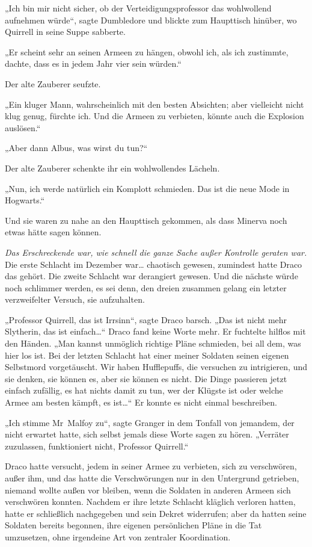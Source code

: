 {„Ich bin mir nicht sicher, ob der Verteidigungsprofessor das wohlwollend aufnehmen würde“, sagte Dumbledore und blickte zum Haupttisch hinüber, wo Quirrell in seine Suppe sabberte.

„Er scheint sehr an seinen Armeen zu hängen, obwohl ich, als ich zustimmte, dachte, dass es in jedem Jahr vier sein würden.“

Der alte Zauberer seufzte.

„Ein kluger Mann, wahrscheinlich mit den besten Absichten; aber vielleicht nicht klug genug, fürchte ich. Und die Armeen zu verbieten, könnte auch die Explosion auslösen.“

„Aber dann Albus, was wirst du tun?“

Der alte Zauberer schenkte ihr ein wohlwollendes Lächeln.

„Nun, ich werde natürlich ein Komplott schmieden. Das ist die neue Mode in Hogwarts.“

Und sie waren zu nahe an den Haupttisch gekommen, als dass Minerva noch etwas hätte sagen können.

\emph{Das Erschreckende war, wie schnell die ganze Sache außer Kontrolle geraten war.} Die erste Schlacht im Dezember war… chaotisch gewesen, zumindest hatte Draco das gehört. Die zweite Schlacht war derangiert gewesen. Und die nächste würde noch schlimmer werden, es sei denn, den dreien zusammen gelang ein letzter verzweifelter Versuch, sie aufzuhalten.

„Professor Quirrell, das ist Irrsinn“, sagte Draco barsch. „Das ist nicht mehr Slytherin, das ist einfach…“ Draco fand keine Worte mehr. Er fuchtelte hilflos mit den Händen. „Man kannst unmöglich richtige Pläne schmieden, bei all dem, was hier los ist. Bei der letzten Schlacht hat einer meiner Soldaten seinen eigenen Selbstmord vorgetäuscht. Wir haben Hufflepuffs, die versuchen zu intrigieren, und sie denken, sie können es, aber sie können es nicht. Die Dinge passieren jetzt einfach zufällig, es hat nichts damit zu tun, wer der Klügste ist oder welche Armee am besten kämpft, es ist…“ Er konnte es nicht einmal beschreiben.

„Ich stimme Mr~Malfoy zu“, sagte Granger in dem Tonfall von jemandem, der nicht erwartet hatte, sich selbst jemals diese Worte sagen zu hören. „Verräter zuzulassen, funktioniert nicht, Professor Quirrell.“

Draco hatte versucht, jedem in seiner Armee zu verbieten, sich zu verschwören, außer ihm, und das hatte die Verschwörungen nur in den Untergrund getrieben, niemand wollte außen vor bleiben, wenn die Soldaten in anderen Armeen sich verschwören konnten. Nachdem er ihre letzte Schlacht kläglich verloren hatten, hatte er schließlich nachgegeben und sein Dekret widerrufen; aber da hatten seine Soldaten bereits begonnen, ihre eigenen persönlichen Pläne in die Tat umzusetzen, ohne irgendeine Art von zentraler Koordination.

}
